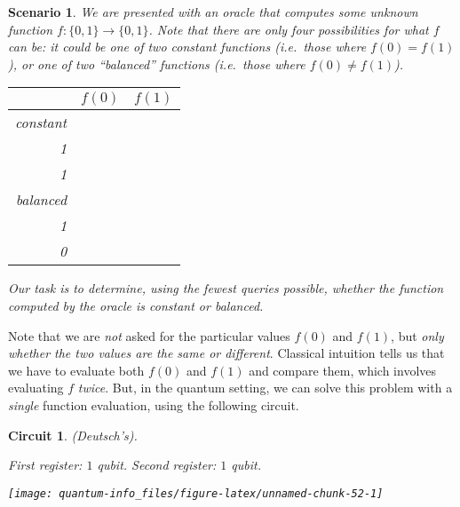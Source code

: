 \documentclass[fleqn]{article}
\renewcommand{\toprule}{}
\renewcommand{\midrule}{}
\renewcommand{\bottomrule}{}
\newtheorem*{scenario}{Scenario}
\newtheorem*{circuit}{Circuit}
\begin{document}
\begin{scenario}

We are presented with an oracle that computes some unknown function \(f\colon\{0,1\}\to\{0,1\}\).
Note that there are only four possibilities for what \(f\) can be: it could be one of two constant functions (i.e.~those where \(f(0)=f(1)\)), or one of two ``balanced'' functions (i.e.~those where \(f(0)\neq f(1)\)).

\begin{longtable}[]{@{}rcc@{}}
\toprule
& \(f(0)\) & \(f(1)\)\tabularnewline
\midrule
\endhead
constant & \(\begin{matrix}0\\1\end{matrix}\) & \(\begin{matrix}0\\1\end{matrix}\)\tabularnewline
balanced & \(\begin{matrix}0\\1\end{matrix}\) & \(\begin{matrix}1\\0\end{matrix}\)\tabularnewline
\bottomrule
\end{longtable}

Our task is to determine, using the fewest queries possible, whether the function computed by the oracle is constant or balanced.

\end{scenario}

Note that we are \emph{not} asked for the particular values \(f(0)\) and \(f(1)\), but \emph{only whether the two values are the same or different}.
Classical intuition tells us that we have to evaluate both \(f(0)\) and \(f(1)\) and compare them, which involves evaluating \(f\) \emph{twice}.
But, in the quantum setting, we can solve this problem with a \emph{single} function evaluation, using the following circuit.

\begin{circuit}

(Deutsch's).

\emph{First register: \(1\) qubit. Second register: \(1\) qubit.}

\begin{center}\texttt{[image: quantum-info\_files/figure-latex/unnamed-chunk-52-1]} \end{center}

\end{circuit}
\end{document}

